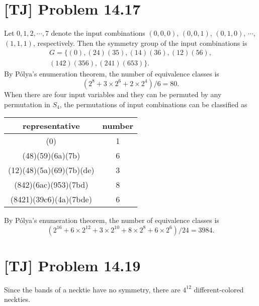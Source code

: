 \documentclass[a4paper,11pt,twocolumn]{article}
\begin{document}
  \section{[TJ] Problem 14.17}
  Let $0, 1, 2, \cdots, 7$ denote the input combinations $(0,0,0)$, $(0,0,1)$, $(0,1,0)$, $\cdots$, $(1,1,1)$, respectively. Then the symmetry group of the input combinations is
  \begin{multline*}
   G = \{(0), (24)(35), (14)(36), (12)(56), \\
    (142)(356), (241)(653)\}.
  \end{multline*}
  By P\'{o}lya's enumeration theorem, the number of equivalence classes is
  $$ (2^8 + 3\times 2^6 + 2\times 2^4)/6 = 80. $$
  When there are four input variables and they can be permuted by any permutation in $S_4$, the permutations of input combinations can be classified as
  \begin{table}[h]
    \centering
    \begin{tabular}{cc}
      \hline
      representative & number \\ \hline
      (0) & 1 \\
      (48)(59)(6a)(7b) & 6  \\
      (12)(48)(5a)(69)(7b)(de) & 3 \\
      (842)(6ac)(953)(7bd) & 8 \\
      (8421)(39c6)(4a)(7bde) & 6 \\
      \hline
    \end{tabular}
  \end{table}
  By P\'{o}lya's enumeration theorem, the number of equivalence classes is
  $$ (2^{16} + 6\times 2^{12} + 3\times 2^{10} + 8\times 2^8 + 6 \times 2^6)/24 = 3984. $$
  
  \section{[TJ] Problem 14.19}
  Since the bands of a necktie have no symmetry, there are $4^12$ different-colored neckties.
\end{document}
